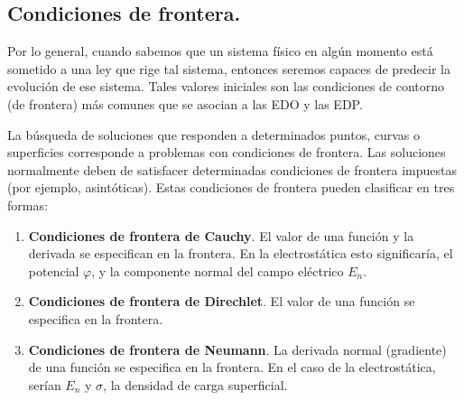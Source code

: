 \subsection{Condiciones de frontera.}
Por lo general, cuando sabemos que un sistema físico en algún momento está sometido a una ley que rige tal sistema, entonces seremos capaces de predecir la evolución de ese sistema. Tales valores iniciales son las condiciones de contorno (de frontera) más comunes que se asocian a las EDO y las EDP. 
\par
La búsqueda de soluciones que responden a determinados puntos, curvas o superficies corresponde a problemas con condiciones de frontera. Las soluciones normalmente deben de satisfacer determinadas condiciones de frontera impuestas (por ejemplo, asintóticas). Estas condiciones de frontera pueden clasificar en tres formas:
\begin{enumerate}
\item \textbf{Condiciones de frontera de Cauchy}. El valor de una función y la derivada se especifican en la frontera. En la electrostática esto significaría, el potencial $\varphi$, y la componente normal del campo eléctrico $E_{n}$.
\item \textbf{Condiciones de frontera de Direchlet}. El valor de una función se especifica en la frontera.
\item \textbf{Condiciones de frontera de Neumann}. La derivada normal (gradiente) de una función se especifica en la frontera. En el caso de la electrostática, serían $E_{n}$ y $\sigma$, la densidad de carga superficial.
\end{enumerate}
